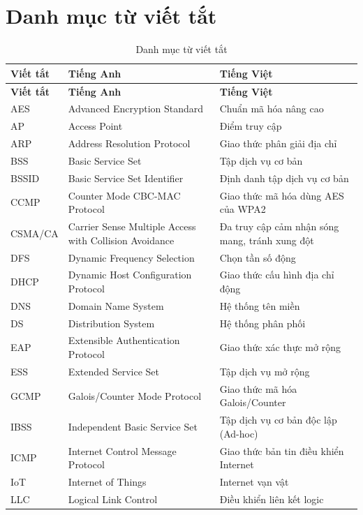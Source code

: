 \documentclass[12pt,a4paper]{article}
\numberwithin{figure}{section}
\numberwithin{table}{section}
\begin{document}
\section{Danh mục từ viết tắt}
\label{app:viettat}
\begin{longtable}{@{}P{2.2cm} P{6.3cm} P{6.2cm}@{}}
  \caption{Danh mục từ viết tắt}\label{tab:viettat}\\
  \toprule
  \textbf{Viết tắt} & \textbf{Tiếng Anh} & \textbf{Tiếng Việt}\\
  \midrule\endfirsthead
  \toprule
  \textbf{Viết tắt} & \textbf{Tiếng Anh} & \textbf{Tiếng Việt}\\
  \midrule\endhead
  \bottomrule\endfoot
  AES & Advanced Encryption Standard & Chuẩn mã hóa nâng cao\\
  AP & Access Point & Điểm truy cập\\
  ARP & Address Resolution Protocol & Giao thức phân giải địa chỉ\\
  BSS & Basic Service Set & Tập dịch vụ cơ bản\\
  BSSID & Basic Service Set Identifier & Định danh tập dịch vụ cơ bản\\
  CCMP & Counter Mode CBC-MAC Protocol & Giao thức mã hóa dùng AES của WPA2\\
  CSMA/CA & Carrier Sense Multiple Access with Collision Avoidance & Đa truy cập
  cảm nhận sóng mang, tránh xung đột\\
  DFS & Dynamic Frequency Selection & Chọn tần số động\\
  DHCP & Dynamic Host Configuration Protocol & Giao thức cấu hình địa chỉ động\\
  DNS & Domain Name System & Hệ thống tên miền\\
  DS & Distribution System & Hệ thống phân phối\\
  EAP & Extensible Authentication Protocol & Giao thức xác thực mở rộng\\
  ESS & Extended Service Set & Tập dịch vụ mở rộng\\
  GCMP & Galois/Counter Mode Protocol & Giao thức mã hóa Galois/Counter\\
  IBSS & Independent Basic Service Set & Tập dịch vụ cơ bản độc lập (Ad-hoc)\\
  ICMP & Internet Control Message Protocol & Giao thức bản tin điều khiển Internet\\
  IoT & Internet of Things & Internet vạn vật\\
  LLC & Logical Link Control & Điều khiển liên kết logic\\

\end{longtable}
\end{document}
